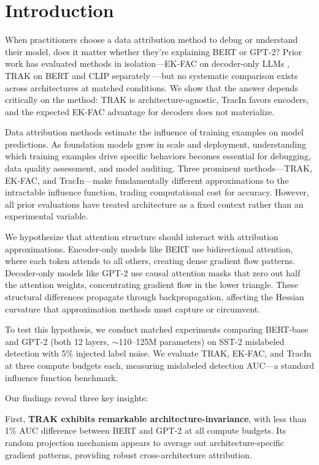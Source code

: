 \section{Introduction}

When practitioners choose a data attribution method to debug or understand their model, does it matter whether they're explaining BERT or GPT-2? Prior work has evaluated methods in isolation---EK-FAC on decoder-only LLMs \citep{grosse2023studying}, TRAK on BERT and CLIP separately \citep{park2023trak}---but no systematic comparison exists across architectures at matched conditions. We show that the answer depends critically on the method: TRAK is architecture-agnostic, TracIn favors encoders, and the expected EK-FAC advantage for decoders does not materialize.

Data attribution methods estimate the influence of training examples on model predictions. As foundation models grow in scale and deployment, understanding which training examples drive specific behaviors becomes essential for debugging, data quality assessment, and model auditing. Three prominent methods---TRAK, EK-FAC, and TracIn---make fundamentally different approximations to the intractable influence function, trading computational cost for accuracy. However, all prior evaluations have treated architecture as a fixed context rather than an experimental variable.

We hypothesize that attention structure should interact with attribution approximations. Encoder-only models like BERT use bidirectional attention, where each token attends to all others, creating dense gradient flow patterns. Decoder-only models like GPT-2 use causal attention masks that zero out half the attention weights, concentrating gradient flow in the lower triangle. These structural differences propagate through backpropagation, affecting the Hessian curvature that approximation methods must capture or circumvent.

To test this hypothesis, we conduct matched experiments comparing BERT-base and GPT-2 (both 12 layers, $\sim$110--125M parameters) on SST-2 mislabeled detection with 5\% injected label noise. We evaluate TRAK, EK-FAC, and TracIn at three compute budgets each, measuring mislabeled detection AUC---a standard influence function benchmark.

Our findings reveal three key insights:

First, \textbf{TRAK exhibits remarkable architecture-invariance}, with less than 1\% AUC difference between BERT and GPT-2 at all compute budgets. Its random projection mechanism appears to average out architecture-specific gradient patterns, providing robust cross-architecture attribution.

